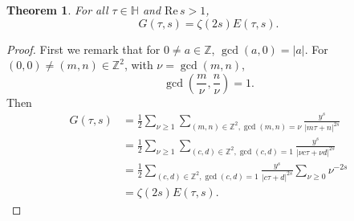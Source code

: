 \documentclass{article}
\def\Re{\ensuremath{\mathrm{Re}}\,}
\newtheorem{theorem}{Theorem}
\theoremstyle{definition}
\begin{document}
\begin{theorem}
For all $\tau \in \mathbb{H}$ and $\Re s>1$,
\[
G(\tau,s)=\zeta(2s) E(\tau,s).
\]
\end{theorem}
\begin{proof}
First we remark that for $0 \neq a \in \mathbb{Z}$, $\gcd(a,0)=|a|$. For $(0,0) \neq (m,n) \in \mathbb{Z}^2$, with
$\nu=\gcd(m,n)$,
\[
\gcd\left(\frac{m}{\nu},\frac{n}{\nu}\right)=1.
\]
Then
\begin{align*}
G(\tau,s)&=\frac{1}{2}  \sum_{\nu \geq 1}  \sum_{(m,n) \in \mathbb{Z}^2, \gcd(m,n)=\nu}
\frac{y^s}{|m\tau+ n|^{2s}}\\
&=\frac{1}{2}  \sum_{\nu \geq 1}  \sum_{(c,d) \in \mathbb{Z}^2, \gcd(c,d)=1}
\frac{y^s}{|\nu c\tau+ \nu d|^{2s}}\\
&=\frac{1}{2}  \sum_{(c,d) \in \mathbb{Z}^2, \gcd(c,d)=1} \frac{y^s}{|c\tau+d|^{2s}}  \sum_{\nu \geq 0} \nu^{-2s}\\
&=\zeta(2s) E(\tau,s).
\end{align*}
\end{proof}
\end{document}
